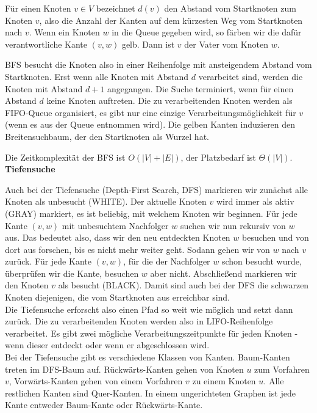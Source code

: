 \documentclass[12pt]{article}
\begin{document}
Für einen Knoten $v \in V$ bezeichnet $d(v)$ den Abstand vom Startknoten zum Knoten $v$, also die Anzahl der Kanten auf dem kürzesten Weg vom Startknoten nach $v$. Wenn ein Knoten $w$ in die Queue gegeben wird, so färben wir die dafür verantwortliche Kante $(v, w)$ gelb. Dann ist $v$ der Vater vom Knoten $w$.

BFS besucht die Knoten also in einer Reihenfolge mit ansteigendem Abstand vom Startknoten. Erst wenn alle Knoten mit Abstand $d$ verarbeitet sind, werden die Knoten mit Abstand $d+1$ angegangen. Die Suche terminiert, wenn für einen Abstand $d$ keine Knoten auftreten. Die zu verarbeitenden Knoten werden als FIFO-Queue organisiert, es gibt nur eine einzige Verarbeitungsmöglichkeit für $v$ (wenn es aus der Queue entnommen wird). Die gelben Kanten induzieren den Breitensuchbaum, der den Startknoten als Wurzel hat.

Die Zeitkomplexität der BFS ist $O(|V| + |E|)$, der Platzbedarf ist $\Theta(|V|)$.\\

\textbf{Tiefensuche}

Auch bei der Tiefensuche (Depth-First Search, DFS) markieren wir zunächst alle Knoten als unbesucht (WHITE). Der aktuelle Knoten $v$ wird immer als aktiv (GRAY) markiert, es ist beliebig, mit welchem Knoten wir beginnen. Für jede Kante $(v, w)$ mit unbesuchtem Nachfolger $w$ suchen wir nun rekursiv von $w$ aus. Das bedeutet also, dass wir den neu entdeckten Knoten $w$ besuchen und von dort aus forschen, bis es nicht mehr weiter geht. Sodann gehen wir von $w$ nach $v$ zurück. Für jede Kante $(v, w)$, für die der Nachfolger $w$ schon besucht wurde, überprüfen wir die Kante, besuchen $w$ aber nicht. Abschließend markieren wir den Knoten $v$ als besucht (BLACK). Damit sind auch bei der DFS die schwarzen Knoten diejenigen, die vom Startknoten aus erreichbar sind.\\

Die Tiefensuche erforscht also einen Pfad so weit wie möglich und setzt dann zurück. Die zu verarbeitenden Knoten werden also in LIFO-Reihenfolge verarbeitet. Es gibt zwei mögliche Verarbeitungszeitpunkte für jeden Knoten - wenn dieser entdeckt oder wenn er abgeschlossen wird.\\

Bei der Tiefensuche gibt es verschiedene Klassen von Kanten. Baum-Kanten treten im DFS-Baum auf. Rückwärts-Kanten gehen von Knoten $u$ zum Vorfahren $v$, Vorwärts-Kanten gehen von einem Vorfahren $v$ zu einem Knoten $u$. Alle restlichen Kanten sind Quer-Kanten. In einem ungerichteten Graphen ist jede Kante entweder Baum-Kante oder Rückwärts-Kante.\\
\end{document}
